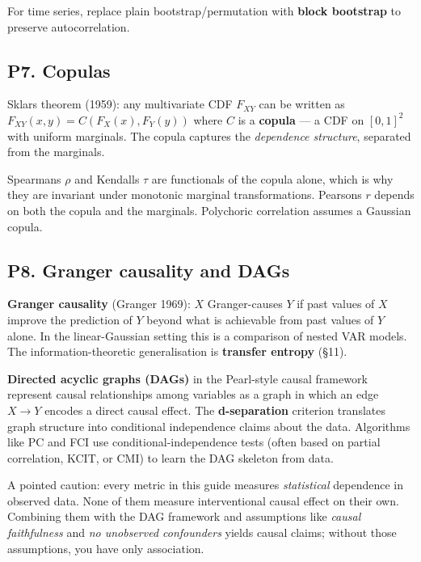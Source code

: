 \documentclass{article}
\begin{document}
For time series, replace plain bootstrap/permutation with \textbf{block
bootstrap} to preserve autocorrelation.

\subsection{P7. Copulas}\label{p7-copulas}

Sklar\textquotesingle s theorem (1959): any multivariate CDF \(F_{XY}\)
can be written as \(F_{XY}(x, y) = C(F_X(x), F_Y(y))\) where \(C\) is a
\textbf{copula} --- a CDF on \([0, 1]^2\) with uniform marginals. The
copula captures the \emph{dependence structure}, separated from the
marginals.

Spearman\textquotesingle s \(\rho\) and Kendall\textquotesingle s
\(\tau\) are functionals of the copula alone, which is why they are
invariant under monotonic marginal transformations.
Pearson\textquotesingle s \(r\) depends on both the copula and the
marginals. Polychoric correlation assumes a Gaussian copula.

\subsection{P8. Granger causality and
DAGs}\label{p8-granger-causality-and-dags}

\textbf{Granger causality} (Granger 1969): \(X\) Granger-causes \(Y\) if
past values of \(X\) improve the prediction of \(Y\) beyond what is
achievable from past values of \(Y\) alone. In the linear-Gaussian
setting this is a comparison of nested VAR models. The
information-theoretic generalisation is \textbf{transfer entropy} (§11).

\textbf{Directed acyclic graphs (DAGs)} in the Pearl-style causal
framework represent causal relationships among variables as a graph in
which an edge \(X \to Y\) encodes a direct causal effect. The
\textbf{d-separation} criterion translates graph structure into
conditional independence claims about the data. Algorithms like PC and
FCI use conditional-independence tests (often based on partial
correlation, KCIT, or CMI) to learn the DAG skeleton from data.

A pointed caution: every metric in this guide measures
\emph{statistical} dependence in observed data. None of them measure
interventional causal effect on their own. Combining them with the DAG
framework and assumptions like \emph{causal faithfulness} and \emph{no
unobserved confounders} yields causal claims; without those assumptions,
you have only association.
\end{document}
